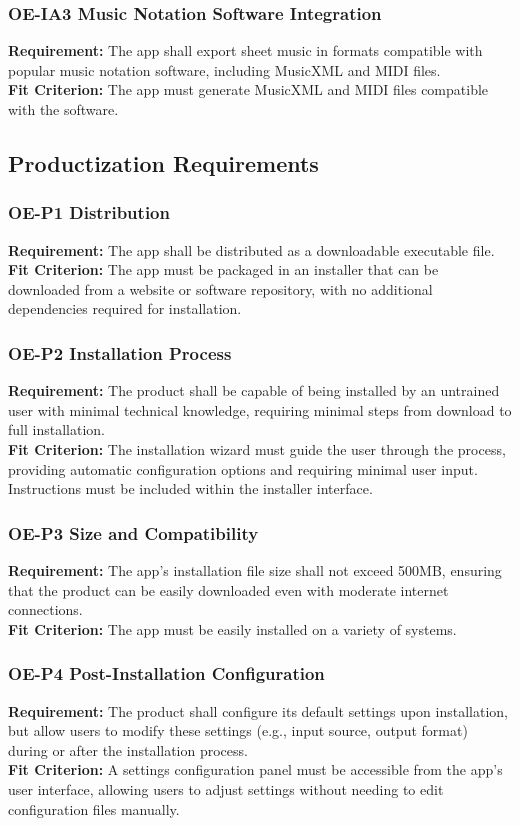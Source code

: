 \documentclass[12pt]{article}
\begin{document}
\subsubsection*{OE-IA3 Music Notation Software Integration} \label{OE-IA3}
\textbf{Requirement:} The app shall export sheet music in formats compatible with popular music notation software, including MusicXML and MIDI files.\\
\textbf{Fit Criterion:} The app must generate MusicXML and MIDI files compatible with the software.\\

\subsection{Productization Requirements}
\subsubsection*{OE-P1 Distribution} \label{OE-P1}
\textbf{Requirement:} The app shall be distributed as a downloadable executable file.\\
\textbf{Fit Criterion:} The app must be packaged in an installer that can be downloaded from a website or software repository, with no additional dependencies required for installation.
\subsubsection*{OE-P2 Installation Process} \label{OE-P2}
\textbf{Requirement:} The product shall be capable of being installed by an untrained user with minimal technical knowledge, requiring minimal steps from download to full installation.\\
\textbf{Fit Criterion:} The installation wizard must guide the user through the process, providing automatic configuration options and requiring minimal user input. Instructions must be included within the installer interface.
\subsubsection*{OE-P3 Size and Compatibility} \label{OE-P3}
\textbf{Requirement:} The app’s installation file size shall not exceed 500MB, ensuring that the product can be easily downloaded even with moderate internet connections.\\
\textbf{Fit Criterion:} The app must be easily installed on a variety of systems.
\subsubsection*{OE-P4 Post-Installation Configuration} \label{OE-P4}
\textbf{Requirement:} The product shall configure its default settings upon installation, but allow users to modify these settings (e.g., input source, output format) during or after the installation process.\\
\textbf{Fit Criterion:} A settings configuration panel must be accessible from the app's user interface, allowing users to adjust settings without needing to edit configuration files manually.
\end{document}
